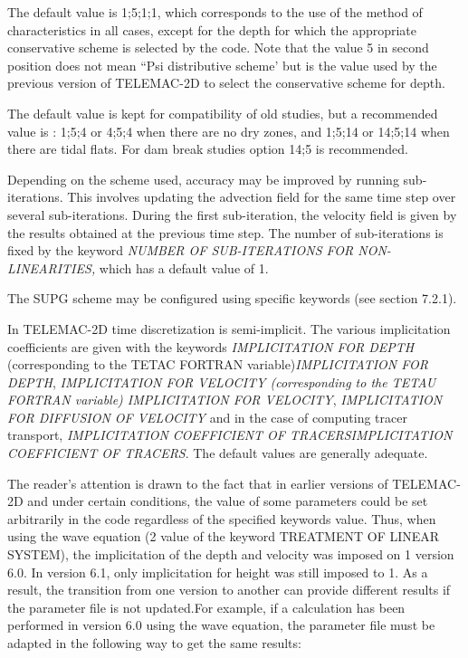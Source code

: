  The default value is 1;5;1;1, which corresponds to the use of the method of characteristics in all cases, except for the depth for which the appropriate conservative scheme is selected by the code. Note that the value 5 in second position does not mean ``Psi distributive scheme' but is the value used by the previous version of TELEMAC-2D to select the conservative scheme for depth.

 The default value is kept for compatibility of old studies, but a recommended value is : 1;5;4 or 4;5;4 when there are no dry zones, and 1;5;14 or 14;5;14 when there are tidal flats. For dam break studies option 14;5 is recommended.

 Depending on the scheme used, accuracy may be improved by running sub-iterations. This involves updating the advection field for the same time step over several sub-iterations. During the first sub-iteration, the velocity field is given by the results obtained at the previous time step. The number of sub-iterations is fixed by the keyword \textit{NUMBER OF SUB-ITERATIONS FOR NON-LINEARITIES,} which has a default value of 1.

 The SUPG scheme may be configured using specific keywords (see section 7.2.1).

 In TELEMAC-2D time discretization is semi-implicit. The various implicitation coefficients are given with the keywords \textit{IMPLICITATION FOR DEPTH }(corresponding to the TETAC FORTRAN variable)\textit{IMPLICITATION FOR DEPTH}, \textit{IMPLICITATION FOR VELOCITY (corresponding to the TETAU FORTRAN variable) IMPLICITATION FOR VELOCITY}, \textit{IMPLICITATION FOR DIFFUSION OF VELOCITY} and in the case of computing tracer transport, \textit{IMPLICITATION COEFFICIENT OF TRACERSIMPLICITATION COEFFICIENT OF TRACERS}. The default values are generally adequate.

 The reader's attention is drawn to the fact that in earlier versions of TELEMAC-2D and under certain conditions, the value of some parameters could be set arbitrarily in the code regardless of the specified keywords value. Thus, when using the wave equation (2 value of the keyword TREATMENT OF LINEAR SYSTEM), the implicitation of the depth and velocity was imposed on 1 version 6.0. In version 6.1, only implicitation for height was still imposed to 1. As a result, the transition from one version to another can provide different results if the parameter file is not updated.For example, if a calculation has been performed in version 6.0 using the wave equation, the parameter file must be adapted in the following way to get the same results:

